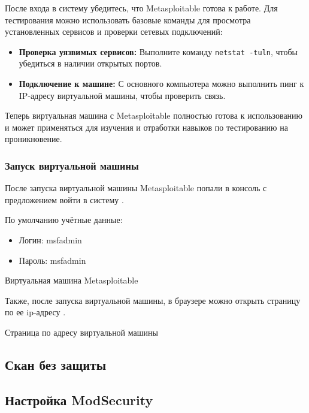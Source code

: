 После входа в систему убедитесь, что Metasploitable готова к работе. Для тестирования можно использовать базовые команды для просмотра установленных сервисов и проверки сетевых подключений:

\begin{itemize}
	\item \textbf{Проверка уязвимых сервисов:} Выполните команду \texttt{netstat -tuln}, чтобы убедиться в наличии открытых портов.
	\item \textbf{Подключение к машине:} С основного компьютера можно выполнить пинг к IP-адресу виртуальной машины, чтобы проверить связь.
\end{itemize}

Теперь виртуальная машина с Metasploitable полностью готова к использованию и может применяться для изучения и отработки навыков по тестированию на проникновение.

\subsubsection{Запуск виртуальной машины}

После запуска виртуальной машины Metasploitable
попали в консоль с предложением войти в систему .

По умолчанию учётные данные:

\begin{itemize}
	\item Логин: msfadmin
	\item Пароль: msfadmin
\end{itemize}

\begin{image}
    \caption{Виртуальная машина Metasploitable}
    \label{fig:vm:run}
\end{image}

Также, после запуска виртуальной машины, в браузере можно открыть страницу
по ее ip-адресу .

\begin{image}
    \caption{Страница по адресу виртуальной машины}
    \label{fig:vm:run:web}
\end{image}

\subsection{Скан без защиты}


\subsection{Настройка ModSecurity}

